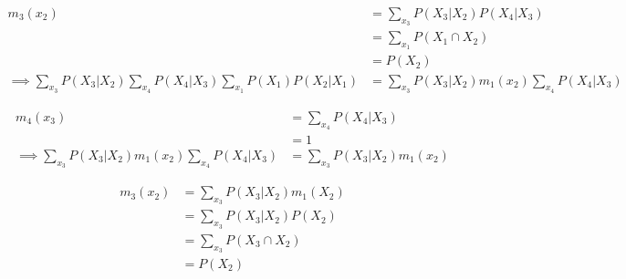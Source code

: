 
\begin{align}
m_3(x_2) &= \sum_{x_3} P(X_3|X_2) P(X_4|X_3) \\
  &= \sum_{x_1} P(X_1 \cap X_2)\\
  &= P(X_2)\\
\implies \sum_{x_3} P(X_3|X_2) \sum_{x_4} P(X_4|X_3)\sum_{x_1} P(X_1)P(X_2|X_1) &= \sum_{x_3} P(X_3|X_2) m_1(x_2) \sum_{x_4} P(X_4|X_3)
\end{align}

\begin{align}
m_4(x_3) &= \sum_{x_4} P(X_4|X_3)\\
  &= 1\\
\implies \sum_{x_3} P(X_3|X_2) m_1(x_2) \sum_{x_4} P(X_4|X_3) &= \sum_{x_3} P(X_3|X_2) m_1(x_2)
\end{align}

\begin{align}
m_3(x_2) &= \sum_{x_3} P(X_3|X_2) m_1(X_2)\\
  &= \sum_{x_3} P(X_3|X_2) P(X_2)\\
  &= \sum_{x_3} P(X_3 \cap X_2)\\
  &= P(X_2)
\end{align}
